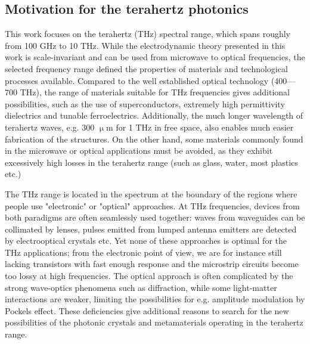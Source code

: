 \subsection{Motivation for the terahertz photonics}
This work focuses on the terahertz (THz) spectral range, which spans roughly from 100 GHz to 10 THz. While the electrodynamic theory presented in this work is scale-invariant and can be used from microwave to optical frequencies, the selected frequency range defined the properties of materials and technological processes available. Compared to the well established optical technology (400---700 THz), the range of materials suitable for THz frequencies gives additional possibilities, such as the use of superconductors, extremely high permittivity dielectrics and tunable ferroelectrics. Additionally, the much longer wavelength of terahertz waves, e.g. 300 $\upmu$m for 1 THz in free space, also enables much easier fabrication of the structures. On the other hand, some materials commonly found in the microwave or optical applications must be avoided, as they exhibit excessively high losses in the terahertz range (such as glass, water, most plastics etc.)


The THz range is located in the spectrum at the boundary of the regions where people use "electronic" or "optical" approaches. At THz frequencies, devices from both paradigms are often seamlessly used together: waves from waveguides can be collimated by lenses, pulses emitted from lumped antenna emitters are detected by electrooptical crystals etc. 
Yet none of these approaches is optimal for the THz applications; from the electronic point of view, we are for instance still lacking transistors with fast enough response and the microstrip circuits become too lossy at high frequencies. The optical approach is often complicated by the strong wave-optics phenomena such as diffraction, while some light-matter interactions are weaker, limiting the possibilities for e.g. amplitude modulation by Pockels effect. These deficiencies give additional reasons to search for the new possibilities of the photonic crystals and metamaterials operating in the terahertz range.

